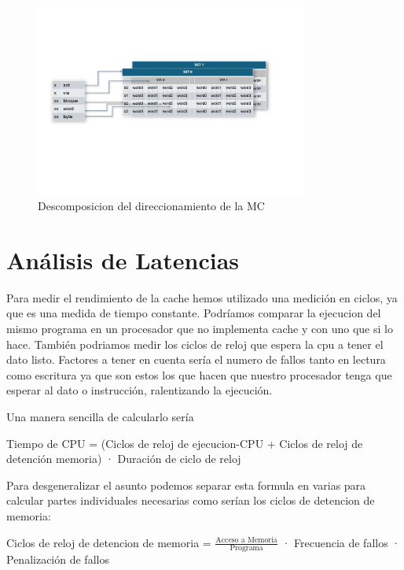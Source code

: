\documentclass{article}
\begin{document}
\begin{figure}[htbp]
  \centering
  \includegraphics[page=1, width=0.8\textwidth, clip]{assets/Descomposicion_Direcciones_light.png}
  \caption{Descomposicion del direccionamiento de la MC}
  \label{fig:imagen}
\end{figure}

\section{Análisis de Latencias}
Para medir el rendimiento de la cache hemos utilizado una medición en ciclos, ya que es una medida de tiempo constante. Podríamos comparar la ejecucion del mismo programa 
en un procesador que no implementa cache y con uno que si lo hace. También podriamos medir los ciclos de reloj que espera la cpu a tener el dato listo. Factores a tener en cuenta 
sería el numero de fallos tanto en lectura como escritura ya que son estos los que hacen que nuestro procesador tenga que esperar al dato o instrucción, ralentizando la ejecución.\cite{HennyPatt}\par
Una manera sencilla de calcularlo sería\par

\begin{adjustwidth}{2cm}{2cm}
\vspace{15pt}
Tiempo de CPU = (Ciclos de reloj de ejecucion-CPU + Ciclos de reloj de detención memoria) · Duración de ciclo de reloj
\vspace{15pt}
\end{adjustwidth}

Para desgeneralizar el asunto podemos separar esta formula en varias para calcular partes individuales necesarias como serían los ciclos de detencion de memoria:

\begin{adjustwidth}{2cm}{2cm}
\vspace{15pt}
  Ciclos de reloj de detencion de memoria = $\frac{\text{Acceso a Memoria}}{\text{Programa}}$ · Frecuencia de fallos · Penalización de fallos
\vspace{15pt}
\end{adjustwidth}
\end{document}
